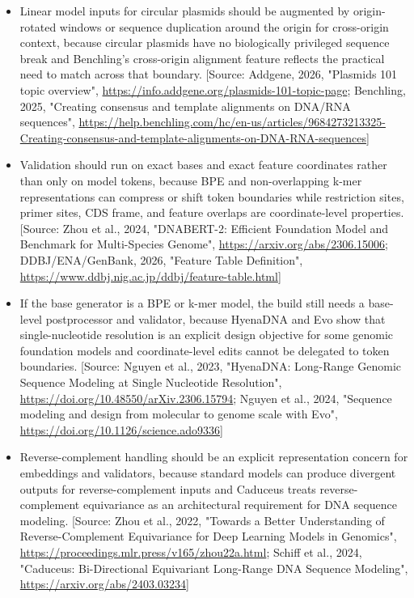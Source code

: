 \documentclass[11pt]{report}
\begin{document}
\begin{itemize}
\item Linear model inputs for circular plasmids should be augmented by origin-rotated windows or sequence duplication around the origin for cross-origin context, because circular plasmids have no biologically privileged sequence break and Benchling's cross-origin alignment feature reflects the practical need to match across that boundary. [Source: Addgene, 2026, "Plasmids 101 topic overview", \url{https://info.addgene.org/plasmids-101-topic-page}; Benchling, 2025, "Creating consensus and template alignments on DNA/RNA sequences", \url{https://help.benchling.com/hc/en-us/articles/9684273213325-Creating-consensus-and-template-alignments-on-DNA-RNA-sequences}]
\item Validation should run on exact bases and exact feature coordinates rather than only on model tokens, because BPE and non-overlapping k-mer representations can compress or shift token boundaries while restriction sites, primer sites, CDS frame, and feature overlaps are coordinate-level properties. [Source: Zhou et al., 2024, "DNABERT-2: Efficient Foundation Model and Benchmark for Multi-Species Genome", \url{https://arxiv.org/abs/2306.15006}; DDBJ/ENA/GenBank, 2026, "Feature Table Definition", \url{https://www.ddbj.nig.ac.jp/ddbj/feature-table.html}]
\item If the base generator is a BPE or k-mer model, the build still needs a base-level postprocessor and validator, because HyenaDNA and Evo show that single-nucleotide resolution is an explicit design objective for some genomic foundation models and coordinate-level edits cannot be delegated to token boundaries. [Source: Nguyen et al., 2023, "HyenaDNA: Long-Range Genomic Sequence Modeling at Single Nucleotide Resolution", \url{https://doi.org/10.48550/arXiv.2306.15794}; Nguyen et al., 2024, "Sequence modeling and design from molecular to genome scale with Evo", \url{https://doi.org/10.1126/science.ado9336}]
\item Reverse-complement handling should be an explicit representation concern for embeddings and validators, because standard models can produce divergent outputs for reverse-complement inputs and Caduceus treats reverse-complement equivariance as an architectural requirement for DNA sequence modeling. [Source: Zhou et al., 2022, "Towards a Better Understanding of Reverse-Complement Equivariance for Deep Learning Models in Genomics", \url{https://proceedings.mlr.press/v165/zhou22a.html}; Schiff et al., 2024, "Caduceus: Bi-Directional Equivariant Long-Range DNA Sequence Modeling", \url{https://arxiv.org/abs/2403.03234}]
\end{itemize}
\end{document}
